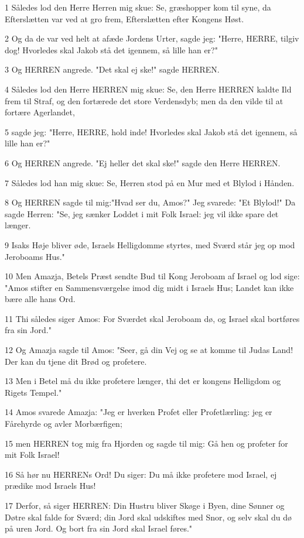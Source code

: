 \par 1 Således lod den Herre Herren mig skue: Se, græshopper kom til syne, da Efterslætten var ved at gro frem, Efterslætten efter Kongens Høst.
\par 2 Og da de var ved helt at afæde Jordens Urter, sagde jeg: "Herre, HERRE, tilgiv dog! Hvorledes skal Jakob stå det igennem, så lille han er?"
\par 3 Og HERREN angrede. "Det skal ej ske!" sagde HERREN.
\par 4 Således lod den Herre HERREN mig skue: Se, den Herre HERREN kaldte Ild frem til Straf, og den fortærede det store Verdensdyb; men da den vilde til at fortære Agerlandet,
\par 5 sagde jeg: "Herre, HERRE, hold inde! Hvorledes skal Jakob stå det igennem, så lille han er?"
\par 6 Og HERREN angrede. "Ej heller det skal ske!" sagde den Herre HERREN.
\par 7 Således lod han mig skue: Se, Herren stod på en Mur med et Blylod i Hånden.
\par 8 Og HERREN sagde til mig:"Hvad ser du, Amos?" Jeg svarede: "Et Blylod!" Da sagde Herren: "Se, jeg sænker Loddet i mit Folk Israel: jeg vil ikke spare det længer.
\par 9 Isaks Høje bliver øde, Israels Helligdomme styrtes, med Sværd står jeg op mod Jeroboams Hus."
\par 10 Men Amazja, Betels Præst sendte Bud til Kong Jeroboam af Israel og lod sige: "Amos stifter en Sammensværgelse imod dig midt i Israels Hus; Landet kan ikke bære alle hans Ord.
\par 11 Thi således siger Amos: For Sværdet skal Jeroboam dø, og Israel skal bortføres fra sin Jord."
\par 12 Og Amazja sagde til Amos: "Seer, gå din Vej og se at komme til Judas Land! Der kan du tjene dit Brød og profetere.
\par 13 Men i Betel må du ikke profetere længer, thi det er kongens Helligdom og Rigets Tempel."
\par 14 Amos svarede Amazja: "Jeg er hverken Profet eller Profetlærling: jeg er Fårehyrde og avler Morbærfigen;
\par 15 men HERREN tog mig fra Hjorden og sagde til mig: Gå hen og profeter for mit Folk Israel!
\par 16 Så hør nu HERRENs Ord! Du siger: Du må ikke profetere mod Israel, ej prædike mod Israels Hus!
\par 17 Derfor, så siger HERREN: Din Hustru bliver Skøge i Byen, dine Sønner og Døtre skal falde for Sværd; din Jord skal udskiftes med Snor, og selv skal du dø på uren Jord. Og bort fra sin Jord skal Israel føres."

